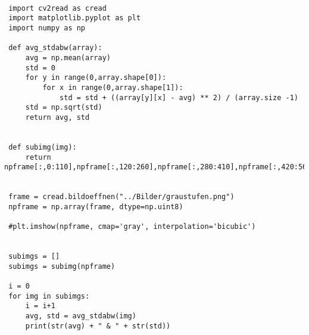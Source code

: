 \begin{lstlisting}[style=PYTHON,frame=single,
 caption=Graustufen Aufnahme Mittelwerte brechnen und StdAbw.
 captionpos=b,
 label=lst:Graustufen]
 
 import cv2read as cread
 import matplotlib.pyplot as plt
 import numpy as np

 def avg_stdabw(array):
     avg = np.mean(array)    
     std = 0
     for y in range(0,array.shape[0]):
         for x in range(0,array.shape[1]):
             std = std + ((array[y][x] - avg) ** 2) / (array.size -1)
     std = np.sqrt(std)
     return avg, std
     
     
 def subimg(img):
     return npframe[:,0:110],npframe[:,120:260],npframe[:,280:410],npframe[:,420:560],npframe[0:460,570:640]

     
 frame = cread.bildoeffnen("../Bilder/graustufen.png")
 npframe = np.array(frame, dtype=np.uint8)
 
 #plt.imshow(npframe, cmap='gray', interpolation='bicubic')


 subimgs = [] 
 subimgs = subimg(npframe)

 i = 0
 for img in subimgs:
     i = i+1
     avg, std = avg_stdabw(img)
     print(str(avg) + " & " + str(std))
\end{lstlisting}